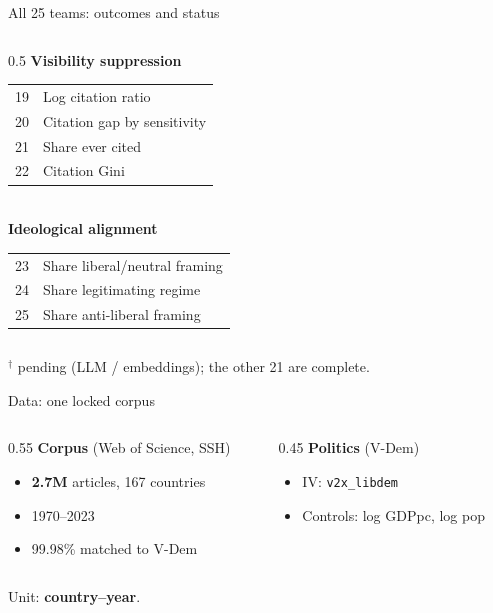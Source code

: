 \documentclass[aspectratio=169,11pt]{beamer}
\newcommand{\key}[1]{\textcolor{agentblue}{\textbf{#1}}}
\begin{document}
\begin{frame}{All 25 teams: outcomes and status}
\begin{columns}[T]
\begin{column}{0.5\textwidth}
      \textbf{Visibility suppression}\\[0.2em]
      \begin{tabular}{@{}r@{\;}l@{}}
        19 & Log citation ratio\\
        20 & Citation gap by sensitivity\\
        21 & Share ever cited\\
        22 & Citation Gini\\
      \end{tabular}\\[0.5em]
      \textbf{Ideological alignment}\\[0.2em]
      \begin{tabular}{@{}r@{\;}l@{}}
        23 & Share liberal/neutral framing\\
        24 & Share legitimating regime\\
        25 & Share anti-liberal framing\\
      \end{tabular}
    \end{column}
  \end{columns}
  \vspace{0.3em}
  {$^\dagger$ pending (LLM / embeddings); the other 21 are complete.}\hfill\hyperlink{ap:toc}{}
\end{frame}
\begin{frame}{Data: one locked corpus}
  \begin{columns}[T]
    \begin{column}{0.55\textwidth}
      \textbf{Corpus} (Web of Science, SSH)
      \begin{itemize}
        \item \key{2.7M} articles, 167 countries
        \item 1970--2023
        \item 99.98\% matched to V-Dem
      \end{itemize}
    \end{column}
    \begin{column}{0.45\textwidth}
      \textbf{Politics} (V-Dem)
      \begin{itemize}
        \item IV: \texttt{v2x\_libdem}
        \item Controls: log GDPpc, log pop
      \end{itemize}
    \end{column}
  \end{columns}
  \vspace{0.8em}
  \centering Unit: \key{country--year}.
\end{frame}
\end{document}
